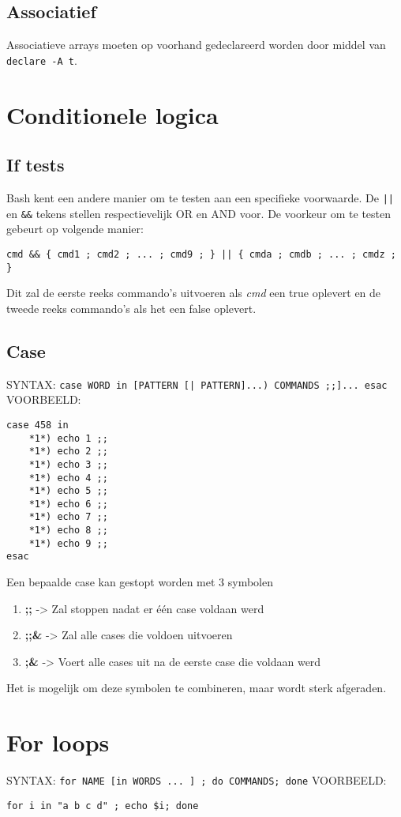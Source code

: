 \documentclass{report}
\begin{document}
\subsection{Associatief}
Associatieve arrays moeten op voorhand gedeclareerd worden door middel van \texttt{declare -A t}. 


\section{Conditionele logica}
\subsection{If tests}
Bash kent een andere manier om te testen aan een specifieke voorwaarde. De \texttt{||} en \texttt{\&\&} tekens stellen respectievelijk OR en AND voor. De voorkeur om te testen gebeurt op volgende manier:
\begin{lstlisting}
cmd && { cmd1 ; cmd2 ; ... ; cmd9 ; } || { cmda ; cmdb ; ... ; cmdz ; }
\end{lstlisting}
Dit zal de eerste reeks commando's uitvoeren als \textit{cmd} een true oplevert en de tweede reeks commando's als het een false oplevert.
\subsection{Case}
SYNTAX: \texttt{case WORD in [PATTERN [| PATTERN]...) COMMANDS ;;]... esac}
VOORBEELD: 
\begin{lstlisting}
case 458 in 
	*1*) echo 1 ;;
	*1*) echo 2 ;;
	*1*) echo 3 ;;
	*1*) echo 4 ;;
	*1*) echo 5 ;;
	*1*) echo 6 ;;
	*1*) echo 7 ;;
	*1*) echo 8 ;;
	*1*) echo 9 ;;
esac
\end{lstlisting}
Een bepaalde case kan gestopt worden met 3 symbolen
\begin{enumerate}
	\item \textbf{;;}   -> Zal stoppen nadat er één case voldaan werd
	\item \textbf{;;\&} -> Zal alle cases die voldoen uitvoeren
	\item \textbf{;\&}  -> Voert alle cases uit na de eerste case die voldaan werd
\end{enumerate}
Het is mogelijk om deze symbolen te combineren, maar wordt sterk afgeraden.
\section{For loops}
SYNTAX: \texttt{for NAME [in WORDS ... ] ; do COMMANDS; done}
VOORBEELD:
\begin{lstlisting}
for i in "a b c d" ; echo $i; done
\end{lstlisting}
\end{document}
